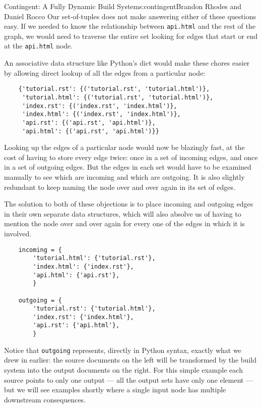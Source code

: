 \begin{aosachapter}{Contingent: A Fully Dynamic Build System}{s:contingent}{Brandon Rhodes and Daniel Rocco}
Our set-of-tuples does not make answering either of these questions
easy. If we needed to know the relationship between \texttt{api.html}
and the rest of the graph, we would need to traverse the entire set
looking for edges that start or end at the \texttt{api.html} node.

An associative data structure like Python's dict would make these chores
easier by allowing direct lookup of all the edges from a particular
node:

\begin{verbatim}
    {'tutorial.rst': {('tutorial.rst', 'tutorial.html')},
     'tutorial.html': {('tutorial.rst', 'tutorial.html')},
     'index.rst': {('index.rst', 'index.html')},
     'index.html': {('index.rst', 'index.html')},
     'api.rst': {('api.rst', 'api.html')},
     'api.html': {('api.rst', 'api.html')}}
\end{verbatim}

Looking up the edges of a particular node would now be blazingly fast,
at the cost of having to store every edge twice: once in a set of
incoming edges, and once in a set of outgoing edges. But the edges in
each set would have to be examined manually to see which are incoming
and which are outgoing. It is also slightly redundant to keep naming the
node over and over again in its set of edges.

The solution to both of these objections is to place incoming and
outgoing edges in their own separate data structures, which will also
absolve us of having to mention the node over and over again for every
one of the edges in which it is involved.

\begin{verbatim}
    incoming = {
        'tutorial.html': {'tutorial.rst'},
        'index.html': {'index.rst'},
        'api.html': {'api.rst'},
        }

    outgoing = {
        'tutorial.rst': {'tutorial.html'},
        'index.rst': {'index.html'},
        'api.rst': {'api.html'},
        }
\end{verbatim}

Notice that \texttt{outgoing} represents, directly in Python syntax,
exactly what we drew in  earlier: the
source documents on the left will be transformed by the build system
into the output documents on the right. For this simple example each
source points to only one output --- all the output sets have only one
element --- but we will see examples shortly where a single input node
has multiple downstream consequences.


\end{aosachapter}
